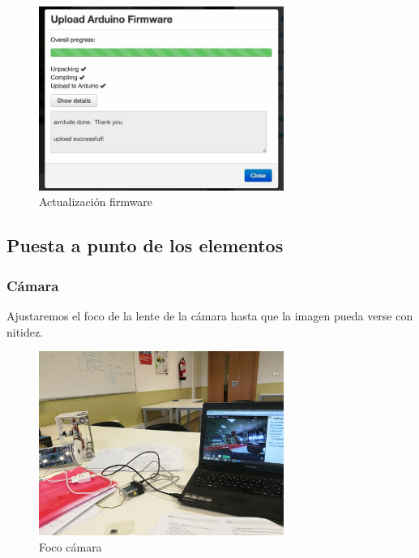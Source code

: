 \begin{enumerate}
\begin{figure} [hbtp]
\begin{center}
  \includegraphics[width=8cm]{img/cap3/3_4/firmware}
\end{center}
\caption{Actualización firmware}
\label{fig:firmware}
\end{figure}

\end{enumerate}
  
  
  
\subsection{Puesta a punto de los elementos}
\label{subsec:elementos}
  \subsubsection{Cámara}
  \label{subsubsec:camara}
Ajustaremos el foco de la lente de la cámara hasta que la imagen pueda verse con nitidez.
\begin{figure} [hbtp]
\begin{center}
  \includegraphics[width=8cm]{img/cap3/3_4/foco}
\end{center}
\caption{Foco cámara}
\label{fig:foco}
\end{figure}
    
